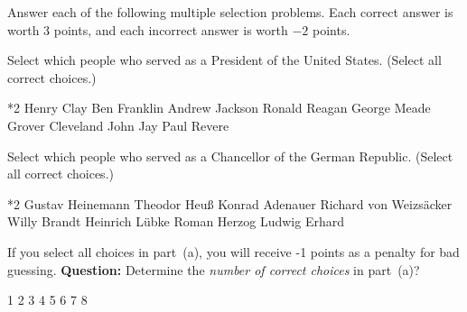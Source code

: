 \documentclass{article}
\begin{document}
\begin{qzbody1}
\begin{quiz*}{\currQuiz}
\begin{questions}
\begin{rtVW}
\multipartquestion
    \item{} Answer each of the following multiple selection problems. Each correct answer
    is worth $3$ points, and each incorrect answer is worth $-2$ points.
    \begin{questions}

\rowsep{3pt}

        \item{} Select which people who served as a President
                     of the United States. (Select all correct choices.)

        \begin{manswers}*{2}%
            \bChoices[random=true]
                 Henry Clay\eAns
                 Ben Franklin\eAns
                  Andrew Jackson\eAns
                  Ronald Reagan\eAns
                 George Meade\eAns
                  Grover Cleveland\eAns
                 John Jay\eAns
                 Paul Revere\eAns
            \eChoices
        \end{manswers}

\rowsep{3pt}

        \item{} Select which people who served as a Chancellor of the
            German Republic. (Select all correct choices.)
        \begin{manswers}*{2}%
            \bChoices[nCols=2,random=true]
                 Gustav Heinemann\eAns
                 Theodor Heu{\ss}\eAns
                  Konrad Adenauer\eAns
                 Richard von Weizs\"{a}cker\eAns
                  Willy Brandt\eAns
                 Heinrich L\"{u}bke\eAns
                 Roman Herzog\eAns
                 Ludwig Erhard\eAns
            \eChoices
        \end{manswers}

\rowsep{3pt}

      \item{} If you select all choices in part~(a), you will
          receive -1 points as a penalty for bad guessing. \textbf{Question:}
          Determine the \emph{number of correct choices} in part~(a)?
          \begin{answers}{4}
          \bChoices[random=true]
             1\eAns
             2\eAns
             3\eAns
             4\eAns
             5\eAns
             6\eAns
             7\eAns
             8\eAns
          \eChoices
          \end{answers}
    \end{questions}
\end{rtVW}


\end{questions}
\end{quiz*}
\end{qzbody1}
\end{document}
